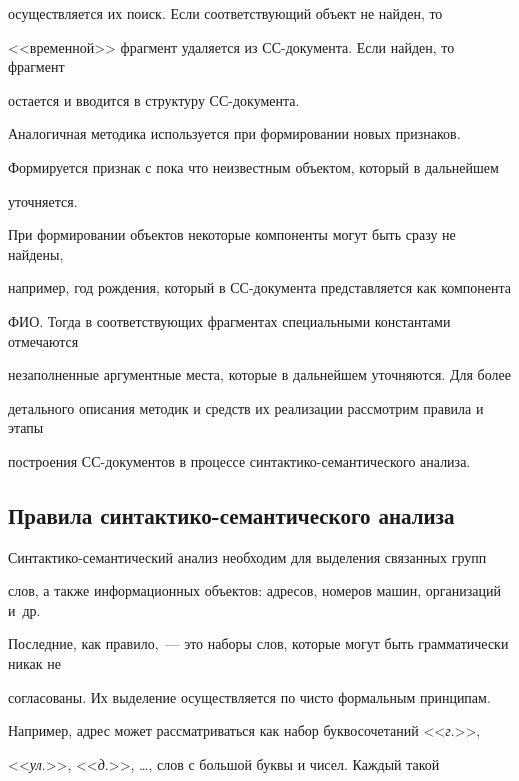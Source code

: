 осуществляется их поиск. Если соответствующий объект не найден, то 


<<временной>> фрагмент удаляется из СС-документа. Если найден, то фрагмент 


остается и вводится в структуру СС-документа.  





Аналогичная методика используется при формировании новых признаков. 


Формируется признак с пока что неизвестным объектом, который в дальнейшем 


уточняется.


 


При формировании объектов некоторые компоненты могут быть сразу не найдены, 


например, год рождения, который в СС-документа представляется как компонента 


ФИО. Тогда в соответствующих фрагментах специальными константами отмечаются 


незаполненные аргументные места, которые в дальнейшем уточняются. Для более 


детального описания методик и средств их реализации рассмотрим правила и этапы 


построения СС-документов в процессе синтактико-се\-ман\-ти\-че\-ско\-го анализа.    


    


\subsection{Правила синтактико-семантического анализа}


    


    Синтактико-семантический анализ необходим для выделения связанных групп 


слов, а также информационных объектов: адресов, номеров машин, организаций и~др. 


Последние, как правило,~--- это наборы слов, которые могут быть грамматически никак не 


согласованы. Их выделение осуществляется по чисто формальным принципам. 


Например, адрес может рассматриваться как набор буквосочетаний <<\textit{г}.>>, 


<<\textit{ул}.>>, <<\textit{д}.>>, \ldots , слов с большой буквы и чисел. Каждый такой 



